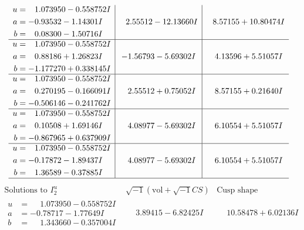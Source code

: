 \documentclass[1p]{elsarticle_modified}
\theoremstyle{definition}
\newcommand{\I}{\sqrt{-1}}
\begin{document}
$$\begin{array}{c|c|c}
\begin{aligned}
u &= \phantom{-}1.073950 - 0.558752 I \\
a &= -0.93532 - 1.14301 I \\
b &= \phantom{-}0.08300 - 1.50716 I\end{aligned}
 & \phantom{-}2.55512 - 12.13660 I & \phantom{-}8.57155 + 10.80474 I \\ \hline\begin{aligned}
u &= \phantom{-}1.073950 - 0.558752 I \\
a &= \phantom{-}0.88186 + 1.26823 I \\
b &= -1.177270 + 0.338145 I\end{aligned}
 & -1.56793 - 5.69302 I & \phantom{-}4.13596 + 5.51057 I \\ \hline\begin{aligned}
u &= \phantom{-}1.073950 - 0.558752 I \\
a &= \phantom{-}0.270195 - 0.166091 I \\
b &= -0.506146 - 0.241762 I\end{aligned}
 & \phantom{-}2.55512 + 0.75052 I & \phantom{-}8.57155 + 0.21640 I \\ \hline\begin{aligned}
u &= \phantom{-}1.073950 - 0.558752 I \\
a &= \phantom{-}0.10508 + 1.69146 I \\
b &= -0.867965 + 0.637909 I\end{aligned}
 & \phantom{-}4.08977 - 5.69302 I & \phantom{-}6.10554 + 5.51057 I \\ \hline\begin{aligned}
u &= \phantom{-}1.073950 - 0.558752 I \\
a &= -0.17872 - 1.89437 I \\
b &= \phantom{-}1.36589 - 0.37885 I\end{aligned}
 & \phantom{-}4.08977 - 5.69302 I & \phantom{-}6.10554 + 5.51057 I\\
 \hline 
 \end{array}$$\newpage$$\begin{array}{c|c|c}  
\text{Solutions to }I^u_{2}& \I (\text{vol} + \sqrt{-1}CS) & \text{Cusp shape}\\
 \hline 
\begin{aligned}
u &= \phantom{-}1.073950 - 0.558752 I \\
a &= -0.78717 - 1.77649 I \\
b &= \phantom{-}1.343660 - 0.357004 I\end{aligned}
 & \phantom{-}3.89415 - 6.82425 I & \phantom{-}10.58478 + 6.02136 I \\ \hline\begin{aligned}

\end{aligned}
\end{array}$$
\end{document}
